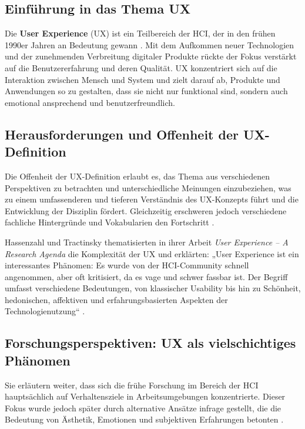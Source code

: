 \documentclass[12pt,oneside]{article}
\begin{document}
\subsection{Einführung in das Thema UX}

Die \textbf{User Experience} (UX) ist ein Teilbereich der HCI, der in den frühen 1990er Jahren an Bedeutung gewann \cite{glanznig}. Mit dem Aufkommen neuer Technologien und der zunehmenden Verbreitung digitaler Produkte rückte der Fokus verstärkt auf die Benutzererfahrung und deren Qualität. UX konzentriert sich auf die Interaktion zwischen Mensch und System und zielt darauf ab, Produkte und Anwendungen so zu gestalten, dass sie nicht nur funktional sind, sondern auch emotional ansprechend und benutzerfreundlich.

\subsection{Herausforderungen und Offenheit der UX-Definition}

Die Offenheit der UX-Definition erlaubt es, das Thema aus verschiedenen Perspektiven zu betrachten und unterschiedliche Meinungen einzubeziehen, was zu einem umfassenderen und tieferen Verständnis des UX-Konzepts führt und die Entwicklung der Disziplin fördert. Gleichzeitig erschweren jedoch verschiedene fachliche Hintergründe und Vokabularien den Fortschritt \cite{glanznig}.

Hassenzahl und Tractinsky thematisierten in ihrer Arbeit \textit{User Experience – A Research Agenda} die Komplexität der UX und erklärten: „User Experience ist ein interessantes Phänomen: Es wurde von der HCI-Community schnell angenommen, aber oft kritisiert, da es vage und schwer fassbar ist. Der Begriff umfasst verschiedene Bedeutungen, von klassischer Usability bis hin zu Schönheit, hedonischen, affektiven und erfahrungsbasierten Aspekten der Technologienutzung“ \cite{research}.

\subsection{Forschungsperspektiven: UX als vielschichtiges Phänomen}

Sie erläutern weiter, dass sich die frühe Forschung im Bereich der HCI hauptsächlich auf Verhaltensziele in Arbeitsumgebungen konzentrierte. Dieser Fokus wurde jedoch später durch alternative Ansätze infrage gestellt, die die Bedeutung von Ästhetik, Emotionen und subjektiven Erfahrungen betonten \cite{research}.
\end{document}
